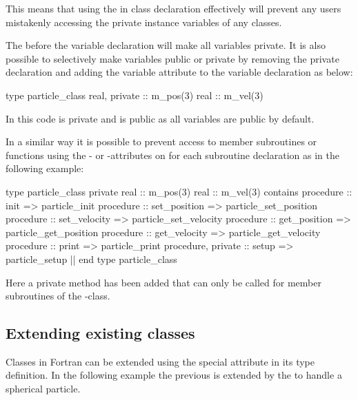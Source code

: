 This means that using the  in class declaration effectively will prevent any users mistakenly accessing the private instance variables of any classes. 

The  before the variable declaration will make all variables private. It is also possible to selectively make variables public or private by removing the private declaration and adding the variable attribute  to the variable declaration as below:

\begin{fortrancodeenv}
type particle_class
    real, private :: m_pos(3)
    real :: m_vel(3)
\end{fortrancodeenv}

In this code  is private and  is public as all variables are public by default.

In a similar way it is possible to prevent access to member subroutines or functions using the - or -attributes on for each subroutine declaration as in the following example:

\begin{fortrancodeenv}
type particle_class
private
    real :: m_pos(3)
    real :: m_vel(3)
contains
    procedure :: init => particle_init
    procedure :: set_position => particle_set_position
    procedure :: set_velocity => particle_set_velocity 
    procedure :: get_position => particle_get_position
    procedure :: get_velocity => particle_get_velocity
    procedure :: print => particle_print
    procedure, private :: setup => particle_setup |\hladded|
end type particle_class
\end{fortrancodeenv}

Here a private method  has been added that can only be called for member subroutines of the -class.

\subsection{Extending existing classes}

Classes in Fortran can be extended using the special attribute  in its type definition. In the following example the previous  is extended by the  to handle a spherical particle. 

